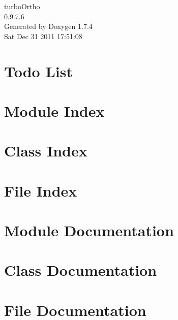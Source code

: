 \documentclass[a4paper]{book}
\begin{document}
\hypersetup{pageanchor=false}
\begin{titlepage}
\vspace*{7cm}
\begin{center}
{\Large turboOrtho \\[1ex]\large 0.9.7.6 }\\
\vspace*{1cm}
{\large Generated by Doxygen 1.7.4}\\
\vspace*{0.5cm}
{\small Sat Dec 31 2011 17:51:08}\\
\end{center}
\end{titlepage}
\clearemptydoublepage
{}
\tableofcontents
\clearemptydoublepage
{}
\hypersetup{pageanchor=true}
\chapter{Todo List}
\label{todo}
\hypertarget{todo}{}

\chapter{Module Index}

\chapter{Class Index}

\chapter{File Index}

\chapter{Module Documentation}





\chapter{Class Documentation}











\chapter{File Documentation}













\printindex
\end{document}
